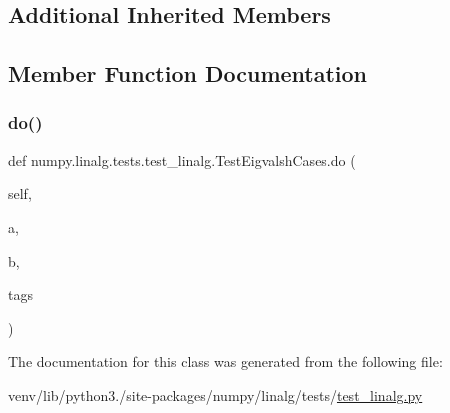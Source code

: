\subsection*{Additional Inherited Members}


\subsection{Member Function Documentation}
\mbox{\label{classnumpy_1_1linalg_1_1tests_1_1test__linalg_1_1TestEigvalshCases_a90a68fccd7fcb0a4af5be867e5952735}} 
\subsubsection{\texorpdfstring{do()}{do()}}
{\footnotesize\ttfamily def numpy.\+linalg.\+tests.\+test\+\_\+linalg.\+Test\+Eigvalsh\+Cases.\+do (\begin{DoxyParamCaption}\item[{}]{self,  }\item[{}]{a,  }\item[{}]{b,  }\item[{}]{tags }\end{DoxyParamCaption})}



The documentation for this class was generated from the following file\+:\begin{DoxyCompactItemize}
\item 
venv/lib/python3./site-\/packages/numpy/linalg/tests/\hyperlink{test__linalg_8py}{test\+\_\+linalg.\+py}\end{DoxyCompactItemize}
